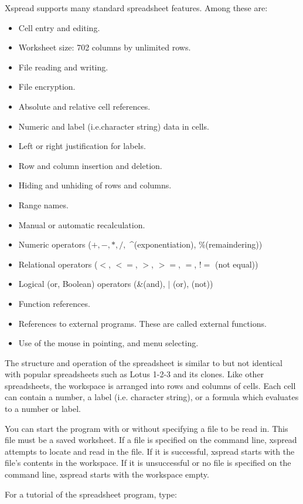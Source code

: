     Xspread supports many standard spreadsheet features.  Among these are:
\begin{itemize}
\item{Cell entry and editing.}
\item{ Worksheet size:  702 columns by unlimited rows.}
\item{File reading and writing.}
\item{File encryption.}
\item{Absolute and relative cell references.}
\item{Numeric and label (i.e.character string) data in cells.}
\item{Left or right justification for labels.}
\item{Row and column insertion and deletion.}
\item{Hiding and unhiding of rows and columns.}
\item{Range names.}
\item{Manual or automatic recalculation.}
\item{Numeric operators ($+, -, *, /,$ \^{ }(exponentiation), \%(remaindering))}
\item{Relational operators ($<$, $<=$, $>$, $>=$, $=$, $!=$ (not equal))}
\item{Logical (or, Boolean) operators (\&(and), $|$ (or), \twiddle (not))}
\item{Function references.}
\item{References to external programs. These are called external functions.}
\item{Use of the mouse in pointing, and menu selecting.}
\end{itemize}

    The structure and operation of the spreadsheet is similar to but not 
identical with popular spreadsheets such as Lotus 1-2-3 and its clones.  Like 
other spreadsheets, the workspace is arranged into rows and columns of cells.  
Each cell can contain a number, a label (i.e. character string), or a formula 
which evaluates to a number or label.

    You can start the program with or without specifying a file to be read in.  
This file must be a saved worksheet.  If a file is specified on the command 
line, xspread attempts to locate and read in the file.  If it is successful, 
xspread starts with the file's contents in the workspace.  If it is 
unsuccessful or no file is specified on the command line, xspread starts with 
the workspace empty.

    For a tutorial of the spreadsheet program, type:

